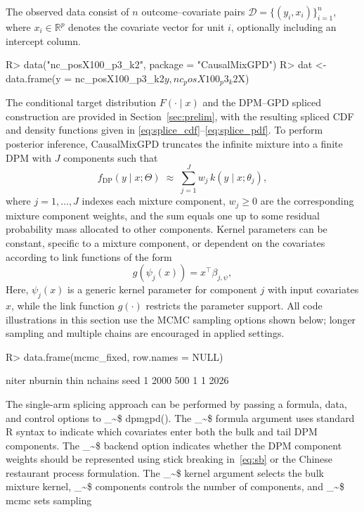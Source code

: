 \documentclass[preprint,12pt,authoryear]{elsarticle}
\makeatletter
\newcommand{\pkg}[1]{\textsf{#1}}
\newcommand{\proglang}[1]{\textsf{#1}}
\newcommand\code{\bgroup\@makeother\_\@makeother\~\@makeother\$\@codex}
\def\@codex#1{{\normalfont\ttfamily\hyphenchar\font=-1 #1}\egroup}
\renewenvironment{Schunk}{\vspace{0pt}}{\vspace{-0.1\baselineskip}}
\makeatother
\begin{document}
The observed data consist of $n$ outcome--covariate pairs
$\mathcal{D}=\{(y_i,x_i)\}_{i=1}^n$, where $x_i\in\mathbb{R}^p$
denotes the covariate vector for unit $i$, optionally including an
intercept column.

\begin{Schunk}
\begin{Sinput}
R> data("nc_posX100_p3_k2", package = "CausalMixGPD")
R> dat <- data.frame(y = nc_posX100_p3_k2$y, nc_posX100_p3_k2$X)
\end{Sinput}
\end{Schunk}

The conditional target distribution $F(\cdot\mid x)$ and the DPM--GPD
spliced construction are provided in Section~\ref{sec:prelim},
with the resulting spliced CDF and density functions given in
\eqref{eq:splice_cdf}--\eqref{eq:splice_pdf}. To perform posterior
inference, \pkg{CausalMixGPD} truncates the infinite mixture into
a finite DPM with $J$ components such that
\begin{equation*}
f_{\mathrm{DP}}(y\mid x;\Theta)\;\approx\;\sum_{j=1}^{J} w_j\,k(y\mid x;\theta_j),
\end{equation*}
where $j=1,\ldots,J$ indexes each mixture component, $w_j\ge 0$
are the corresponding mixture component weights, and the sum equals
one up to some residual probability mass allocated to other
components. Kernel parameters can be constant, specific to a
mixture component, or dependent on the covariates according to
link functions of the form
\begin{equation*}
  g\!\left(\psi_j(x)\right)=x^\top \beta_{j,\psi},
\end{equation*}
Here, $\psi_j(x)$ is a generic kernel parameter for component $j$
with input covariates $x$, while the link function $g(\cdot)$
restricts the parameter support. All code illustrations in this
section use the MCMC sampling options shown below;
longer sampling and multiple chains are encouraged in applied settings.

\begin{Schunk}
\begin{Sinput}
R> data.frame(mcmc_fixed, row.names = NULL)
\end{Sinput}
\begin{Soutput}
  niter nburnin thin nchains seed
1  2000     500    1       1 2026
\end{Soutput}
\end{Schunk}

The single-arm splicing approach can be performed by passing a
formula, data, and control options to \code{dpmgpd()}. The
\code{formula} argument uses standard \proglang{R} syntax to indicate
which covariates enter both the bulk and tail DPM components.
The \code{backend} option indicates whether the DPM component
weights should be represented using stick breaking in~\eqref{eq:sb}
or the Chinese restaurant process formulation. The \code{kernel}
argument selects the bulk mixture kernel, \code{components}
controls the number of components, and \code{mcmc} sets sampling
\end{document}
